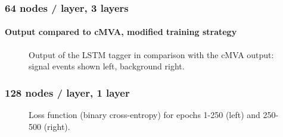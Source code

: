 \documentclass{beamer}
\begin{document}
\begin{frame}
  \frametitle{64 nodes / layer, 3 layers}
  \framesubtitle{Output compared to cMVA, modified training strategy}
  \begin{figure}[htb]
    \centering

    \caption{Output of the LSTM tagger in comparison with the cMVA output: signal events shown left, background right.}
  \end{figure}
\end{frame}


\begin{frame}
  \frametitle{128 nodes / layer, 1 layer}

  \begin{figure}[htb]
    \centering

    \caption{Loss function (binary cross-entropy) for epochs 1-250 (left) and 250-500 (right).}
  \end{figure}

\end{frame}
\end{document}
